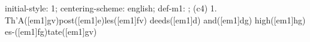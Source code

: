 initial-style: 1;
centering-scheme: english;
def-m1: \grealign;
(c4) 1. Th'A([em1]gv)post([em1]e)les([em1]fv) deeds([em1]d) and([em1]dg) high([em1]hg) es-([em1]fg)tate([em1]gv)